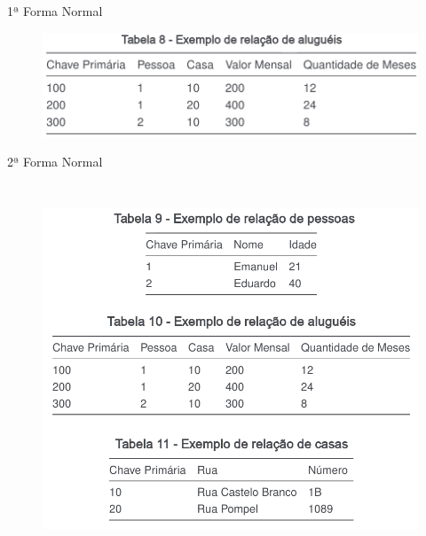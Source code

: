 \documentclass{beamer} %
\begin{document}
\begin{frame}{1ª Forma Normal}
    \begin{figure}
        \centering
        \includegraphics[width=\linewidth]{imagens/tabela-alugueis.png}
        \label{fig:1-forma-normal-certo}
    \end{figure}
\end{frame}

\begin{frame}{2ª Forma Normal}
\begin{columns}
    
    \begin{figure}
        \centering
        \includegraphics[width=\linewidth]{imagens/2-forma-normal-certo.png}
        \label{fig:2-forma-normal-certo}
    \end{figure}
    
    

\end{columns}
\end{frame}
\end{document}
